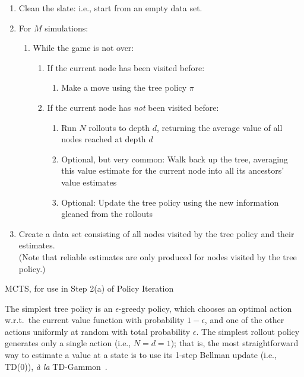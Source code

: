 \documentclass{article}
\begin{document}
\begin{table}[h!]
\begin{enumerate}
\item Clean the slate: i.e., start from an empty data set.
    
\item For $M$ simulations:

\begin{enumerate}
\item While the game is not over:
    
\begin{enumerate}
\item If the current node has been visited before:
    
\begin{enumerate}
\item Make a move using the tree policy $\pi$
\end{enumerate}

\item If the current node has \emph{not\/} been visited before:
  
\begin{enumerate}
\item Run $N$ rollouts to depth $d$, returning the average value of all nodes reached at depth $d$

\item Optional, but very common: Walk back up the tree, averaging this value estimate
  for the current node into all its ancestors' value estimates

\item Optional: Update the tree policy using the new information gleaned from the rollouts
\end{enumerate}
\end{enumerate}
\end{enumerate}

\item Create a data set consisting of all nodes visited by the tree policy and their estimates. \\
  (Note that reliable estimates are only produced for nodes visited by the tree policy.)
\end{enumerate}
\caption{MCTS, for use in Step 2(a) of Policy Iteration}
\label{alg:mcts}
\end{table}

The simplest tree policy is an $\epsilon$-greedy policy, which chooses
an optimal action w.r.t.\ the current value function with probability
$1-\epsilon$, and one of the other actions uniformly at random with
total probability $\epsilon$.  The simplest rollout policy generates
only a single action (i.e., $N = d = 1$); that is, the most
straightforward way to estimate a value at a state is to use its
1-step Bellman update (i.e., TD(0)), \emph{\`{a} la\/} TD-Gammon~\cite{tdgammon}.
\end{document}
